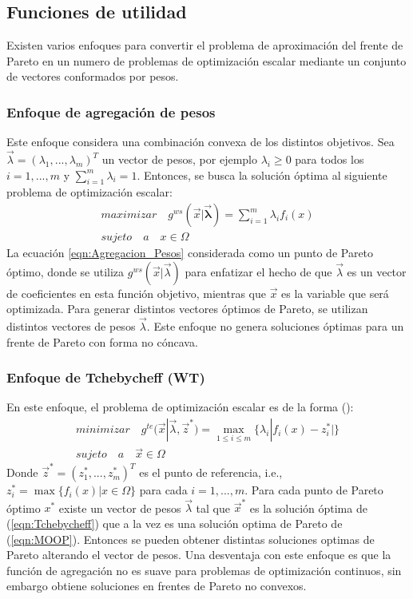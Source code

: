 \subsection*{Funciones de utilidad}
Existen varios enfoques para convertir el problema de aproximación del frente de Pareto en un numero de problemas de optimización escalar mediante un conjunto de vectores conformados por pesos.
%
\subsubsection*{Enfoque de agregación de pesos}
Este enfoque considera una combinación convexa de los distintos objetivos.
%
Sea $\vec{\lambda} = ( \lambda_1,..., \lambda_m)^T$ un vector de pesos, por ejemplo $\lambda_i \geq 0 $ para todos los $i=1,...,m$ y $\sum_{i=1}^{m} \lambda_i = 1$.
%
Entonces, se busca la solución óptima al siguiente problema de optimización escalar:
\begin{equation} 
\label{eqn:Agregacion_Pesos}
\begin{split}
maximizar \quad g^{ws}(\vec{x} | \mathbf{\vec{\lambda}}) = \sum_{i=1}^m \lambda_i f_i(x) \\
sujeto \quad a \quad x \in \Omega
\end{split}
\end{equation}
La ecuación \ref{eqn:Agregacion_Pesos} considerada como un punto de Pareto óptimo, donde se utiliza $g^{ws}(\vec{x} | \vec{\lambda})$ para enfatizar el hecho de que $\vec{\lambda}$ es un vector de coeficientes en esta función objetivo, mientras que $\vec{x}$ es la variable que será optimizada.
%
Para generar distintos vectores óptimos de Pareto, se utilizan distintos vectores de pesos $\vec{\lambda}$.
%
Este enfoque no genera soluciones óptimas para un frente de Pareto con forma no cóncava.
%
\subsubsection*{Enfoque de Tchebycheff (WT)}
En este enfoque, el problema de optimización escalar es de la forma (\cite{Joel:MOEAD}):
\begin{equation}
\label{eqn:Tchebycheff}
\begin{split}
minimizar \quad g^{te}(\vec{x} | \vec{\lambda},\vec{z}^*) = \max\limits_{1 \leq i \leq m} \{ \lambda_i | f_i(x) - z_i^* | \} \\
sujeto \quad a \quad \vec{x} \in \Omega
\end{split}
\end{equation}
Donde $\vec{z}^* = (z_1^*, ..., z_m^*)^T$ es el punto de referencia, i.e., $z_i^* = \max\{ f_i(x)|x \in \Omega \}$ para cada $i=1,...,m$.
%
Para cada punto de Pareto \'optimo $x^*$ existe un vector de pesos $\vec{\lambda}$ tal que $\vec{x}^*$ es la solución óptima de (\ref{eqn:Tchebycheff}) que a la vez es una solución optima de Pareto de (\ref{eqn:MOOP}).
%
Entonces se pueden obtener distintas soluciones optimas de Pareto alterando el vector de pesos.
%
Una desventaja con este enfoque es que la función de agregación no es suave para problemas de optimización continuos, sin embargo obtiene soluciones en frentes de Pareto no convexos.
%
